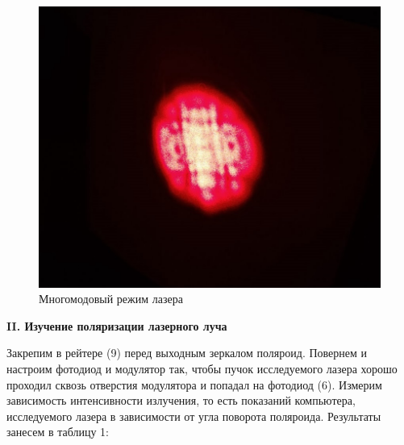 \documentclass[a4paper,12pt]{article} %
\begin{document}
	\begin{figure}[h!]
		\centering
		\includegraphics[scale=0.72]{Pictures/Многомодовый}
		\caption{Многомодовый режим лазера}
	\end{figure}

	\newpage

	\begin{center}
		\textbf{II. Изучение поляризации лазерного луча}
	\end{center}
	
	Закрепим в рейтере (9) перед выходным зеркалом поляроид. Повернем и настроим фотодиод и модулятор так, чтобы пучок исследуемого лазера хорошо проходил сквозь отверстия модулятора и попадал на фотодиод (6). Измерим зависимость интенсивности излучения, то есть показаний компьютера, исследуемого лазера в зависимости от угла поворота поляроида. Результаты занесем в таблицу 1:
	
\end{document}
